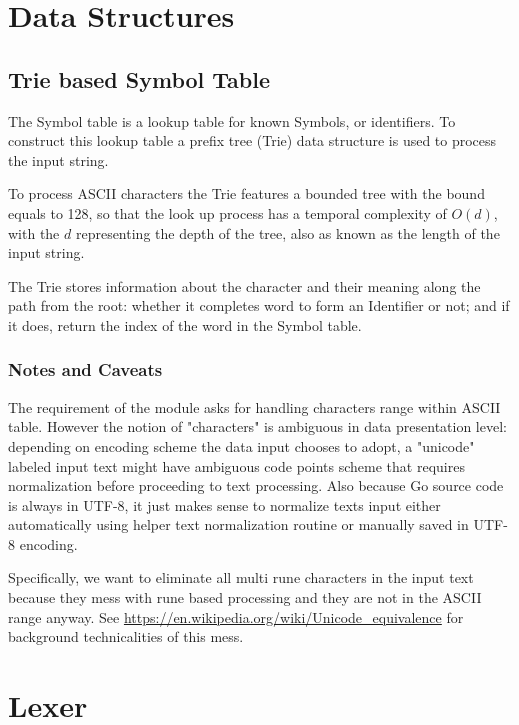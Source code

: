 \documentclass[%
 aip,
 jmp,%
 amsmath,amssymb,
 reprint,%
]{revtex4-1}
\begin{document}
\section{\label{sec:level1}Data Structures}



\subsection{\label{sec:level2}Trie based Symbol Table}

The Symbol table is a lookup table for known Symbols, or identifiers. To
construct this lookup table a prefix tree (Trie) data structure is used to
process the input string.

To process ASCII characters the Trie features a bounded tree with the bound
equals to 128, so that the look up process has a temporal complexity of $O(d)$,
with the $d$ representing the depth of the tree, also as known as the length of
the input string.

The Trie stores information about the character and their meaning along the
path from the root: whether it completes word to form an Identifier or not;
and if it does, return the index of the word in the Symbol table.

\subsubsection{\label{sec:level3}Notes and Caveats}
The requirement of the module asks for handling characters range within ASCII
table. However the notion of "characters" is ambiguous in data presentation
level: depending on encoding scheme the data input chooses to adopt, a
"unicode" labeled input text might have ambiguous code points scheme that
requires normalization before proceeding to text processing. Also because Go
source code is always in UTF-8, it just makes sense to normalize texts input
either automatically using helper text normalization routine or manually saved
in UTF-8 encoding.

Specifically, we want to eliminate all multi rune
characters in the input text because they mess with rune based processing and
they are not in the ASCII range anyway.
See \url{https://en.wikipedia.org/wiki/Unicode_equivalence}
for background technicalities of this mess.

\section{Lexer}
\end{document}
